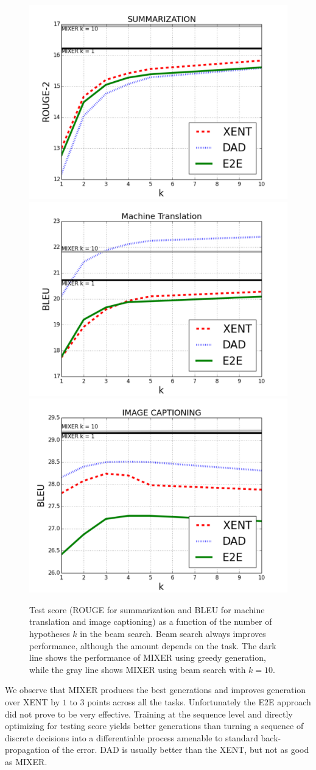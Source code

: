 \begin{figure}[!t]
\begin{center}
 \includegraphics[width=.35\linewidth]{summarization_beamsearch.pdf}
 \hspace{-.6cm}
 \includegraphics[width=.35\linewidth]{mt_beamsearch.pdf}
 \hspace{-.6cm}
  \includegraphics[width=.35\linewidth]{ic_beamsearch.pdf}
\end{center}
\vspace{-.2cm}
\caption{Test score (ROUGE for summarization and BLEU for machine translation and image captioning) as a function of the number of hypotheses $k$ in the beam search. Beam search always improves performance, although the amount depends on the task. The dark line shows the performance of MIXER using greedy generation, while the gray line shows MIXER using beam search with $k=10$.}
\label{fig:beam_search}
\end{figure}

We observe that MIXER produces the best generations and improves generation over XENT by $1$ to $3$ points across all the tasks. 
Unfortunately the E2E approach did not prove to be very effective. Training at the sequence level and directly optimizing for testing score yields better generations than turning a sequence of discrete decisions into a differentiable process amenable to standard back-propagation of the error. 
DAD is usually better than the XENT, but not as good as MIXER.  

